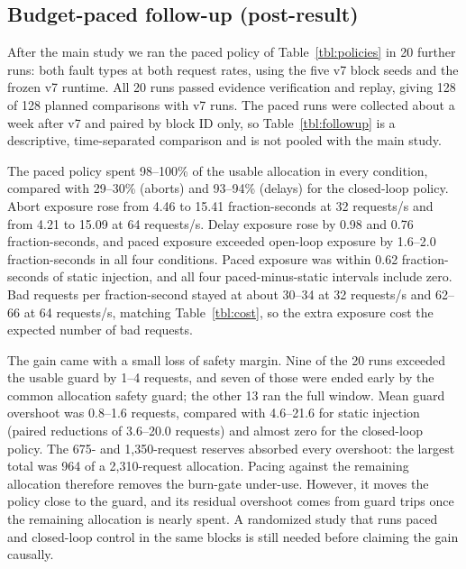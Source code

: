 \subsection{Budget-paced follow-up (post-result)}\label{sec:followup}
After the main study we ran the paced policy of Table~\ref{tbl:policies} in 20 further runs: both fault types at both request rates, using the five v7 block seeds and the frozen v7 runtime. All 20 runs passed evidence verification and replay, giving 128 of 128 planned comparisons with v7 runs. The paced runs were collected about a week after v7 and paired by block ID only, so Table~\ref{tbl:followup} is a descriptive, time-separated comparison and is not pooled with the main study.

The paced policy spent 98--100\% of the usable allocation in every condition, compared with 29--30\% (aborts) and 93--94\% (delays) for the closed-loop policy. Abort exposure rose from 4.46 to 15.41 fraction-seconds at 32 requests/s and from 4.21 to 15.09 at 64 requests/s. Delay exposure rose by 0.98 and 0.76 fraction-seconds, and paced exposure exceeded open-loop exposure by 1.6--2.0 fraction-seconds in all four conditions. Paced exposure was within 0.62 fraction-seconds of static injection, and all four paced-minus-static intervals include zero. Bad requests per fraction-second stayed at about 30--34 at 32 requests/s and 62--66 at 64 requests/s, matching Table~\ref{tbl:cost}, so the extra exposure cost the expected number of bad requests.

The gain came with a small loss of safety margin. Nine of the 20 runs exceeded the usable guard by 1--4 requests, and seven of those were ended early by the common allocation safety guard; the other 13 ran the full window. Mean guard overshoot was 0.8--1.6 requests, compared with 4.6--21.6 for static injection (paired reductions of 3.6--20.0 requests) and almost zero for the closed-loop policy. The 675- and 1,350-request reserves absorbed every overshoot: the largest total was 964 of a 2,310-request allocation. Pacing against the remaining allocation therefore removes the burn-gate under-use. However, it moves the policy close to the guard, and its residual overshoot comes from guard trips once the remaining allocation is nearly spent. A randomized study that runs paced and closed-loop control in the same blocks is still needed before claiming the gain causally.


